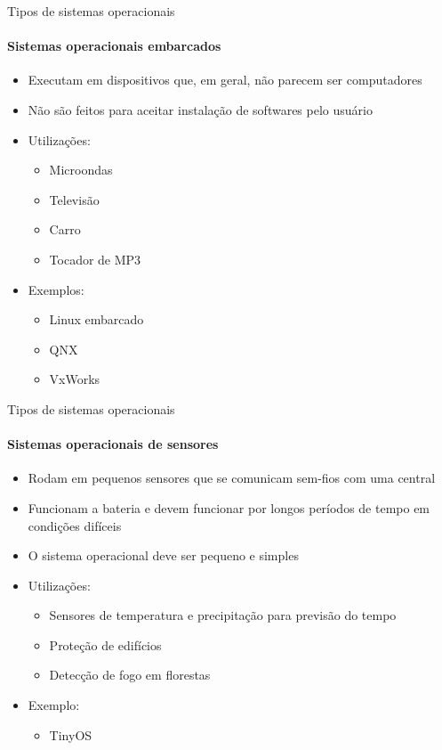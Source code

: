 \documentclass{beamer}
\begin{document}
\begin{frame}{Tipos de sistemas operacionais}
	\framesubtitle{Sistemas operacionais embarcados}
	\begin{itemize}
		\item Executam em dispositivos que, em geral, não parecem ser computadores
		\item Não são feitos para aceitar instalação de softwares pelo usuário
		\item Utilizações:
		\begin{itemize}
			\item Microondas
			\item Televisão
			\item Carro
			\item Tocador de MP3
		\end{itemize}
		\item Exemplos:
		\begin{itemize}
			\item Linux embarcado
			\item QNX
			\item VxWorks
		\end{itemize}
	\end{itemize}
\end{frame}
\begin{frame}{Tipos de sistemas operacionais}
	\framesubtitle{Sistemas operacionais de sensores}
	\begin{itemize}
		\item Rodam em pequenos sensores que se comunicam sem-fios com uma central
		\item Funcionam a bateria e devem funcionar por longos períodos de tempo em condições difíceis
		\item O sistema operacional deve ser pequeno e simples
		\item Utilizações:
		\begin{itemize}
			\item Sensores de temperatura e precipitação para previsão do tempo
			\item Proteção de edifícios
			\item Detecção de fogo em florestas
		\end{itemize}
		\item Exemplo:
		\begin{itemize}
			\item TinyOS
		\end{itemize}
	\end{itemize}
\end{frame}
\end{document}
